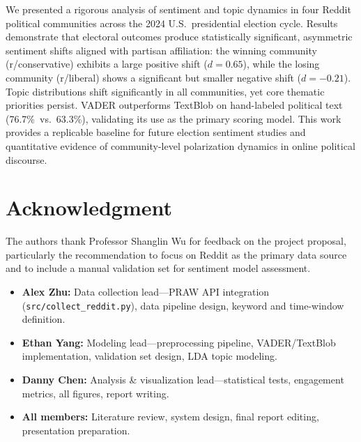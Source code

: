 \documentclass[journal]{IEEEtran}
\begin{document}
We presented a rigorous analysis of sentiment and topic dynamics in
four Reddit political communities across the 2024 U.S.\ presidential
election cycle. Results demonstrate that electoral outcomes produce
statistically significant, asymmetric sentiment shifts aligned with
partisan affiliation: the winning community (r/conservative) exhibits
a large positive shift ($d = 0.65$), while the losing community
(r/liberal) shows a significant but smaller negative shift ($d = -0.21$).
Topic distributions shift significantly in all communities, yet core
thematic priorities persist. VADER outperforms TextBlob on hand-labeled
political text (76.7\%\ vs.\ 63.3\%), validating its use as the primary
scoring model. This work provides a replicable baseline for future
election sentiment studies and quantitative evidence of community-level
polarization dynamics in online political discourse.

\section*{Acknowledgment}

The authors thank Professor Shanglin Wu for feedback on the project
proposal, particularly the recommendation to focus on Reddit as the
primary data source and to include a manual validation set for
sentiment model assessment.

\begin{itemize}
  \item \textbf{Alex Zhu:} Data collection lead---PRAW API integration
        (\texttt{src/collect\_reddit.py}), data pipeline design,
        keyword and time-window definition.
  \item \textbf{Ethan Yang:} Modeling lead---preprocessing pipeline,
        VADER/TextBlob implementation, validation set design, LDA
        topic modeling.
  \item \textbf{Danny Chen:} Analysis \& visualization lead---statistical
        tests, engagement metrics, all figures, report writing.
  \item \textbf{All members:} Literature review, system design,
        final report editing, presentation preparation.
\end{itemize}
\end{document}
